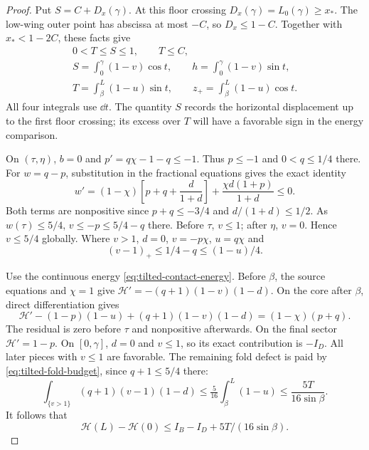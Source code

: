 \begin{proof}
Put $S=C+D_x(\gamma)$. At this floor crossing
$D_x(\gamma)=L_0(\gamma)\ge x_*$. The low-wing outer
point has abscissa at most $-C$, so $D_x\le1-C$.
Together with $x_*<1-2C$, these facts give
\begin{equation}\label{eq:tilted-first-floor-moments}
 \begin{gathered}
 0<T\le S\le1,\qquad T\le C,\\
 S=\int_0^\gamma(1-v)\cos t,\qquad
 h=\int_0^\gamma(1-v)\sin t,\\
 T=\int_\beta^L(1-u)\sin t,\qquad
 z_+=\int_\beta^L(1-u)\cos t.
 \end{gathered}
\end{equation}
All four integrals use $\dd t$. The quantity $S$ records the
horizontal displacement up to the first floor crossing; its excess
over $T$ will have a favorable sign in the energy comparison.

On $(\tau,\eta)$, $b=0$ and $p'=q\chi-1-q\le-1$.
Thus $p\le-1$ and $0<q\le1/4$ there. For $w=q-p$,
substitution in the fractional equations gives the exact identity
\[
 w'=(1-\chi)\left[p+q+\frac d{1+d}\right]
             +\frac{\chi d(1+p)}{1+d}\le0.
\]
Both terms are nonpositive since $p+q\le-3/4$ and
$d/(1+d)\le1/2$. As $w(\tau)\le5/4$,
$v\le-p\le5/4-q$ there. Before $\tau$, $v\le1$;
after $\eta$, $v=0$. Hence $v\le5/4$ globally.
Where $v>1$, $d=0$, $v=-p\chi$, $u=q\chi$ and
\begin{equation}\label{eq:tilted-fold-budget}
 (v-1)_+\le1/4-q\le(1-u)/4.
\end{equation}

Use the continuous energy \cref{eq:tilted-contact-energy}.
Before $\beta$, the source equations and $\chi=1$ give
$\mathcal H'=-(q+1)(1-v)(1-d)$.
On the core after $\beta$, direct differentiation gives
\begin{equation}\label{eq:tilted-fractional-energy}
 \mathcal H'-(1-p)(1-u)+(q+1)(1-v)(1-d)
                         =(1-\chi)(p+q).
\end{equation}
The residual is zero before $\tau$ and nonpositive afterwards.
On the final sector $\mathcal H'=1-p$.
On $[0,\gamma]$, $d=0$ and $v\le1$, so its exact contribution
is $-I_D$. All later pieces with $v\le1$ are favorable.
The remaining fold defect is paid by
\cref{eq:tilted-fold-budget}, since $q+1\le5/4$ there:
\[
 \int_{\{v>1\}}(q+1)(v-1)(1-d)
       \le\tfrac5{16}\int_\beta^L(1-u)
       \le\frac{5T}{16\sin\beta}.
\]
It follows that
\begin{equation}\label{eq:tilted-energy-defect}
 \mathcal H(L)-\mathcal H(0)
             \le I_B-I_D+5T/(16\sin\beta).
\end{equation}


\end{proof}
